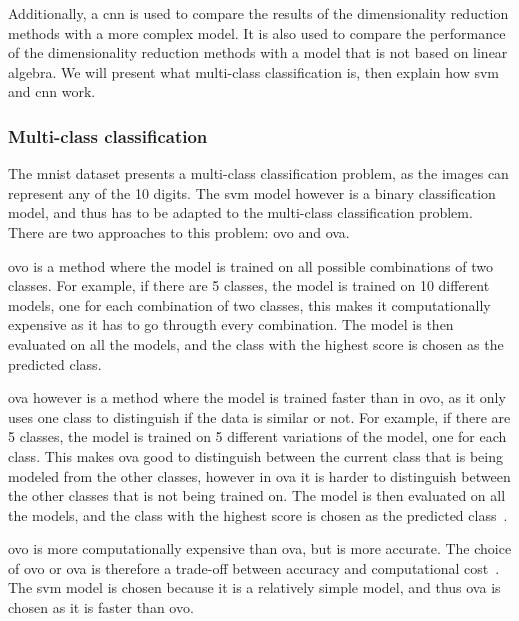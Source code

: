 
Additionally, a \gls{cnn} is used to compare the results of the dimensionality reduction methods with a more complex model. It is also used to compare the performance of the dimensionality reduction methods with a model that is not based on linear algebra. We will present what multi-class classification is, then explain how \gls{svm} and \gls{cnn} work.


\subsubsection{Multi-class classification}\label{subsubsec:multi-class-classification}
The \gls{mnist} dataset presents a multi-class classification problem, as the images can represent any of the 10 digits. The \gls{svm} model however is a binary classification model, and thus has to be adapted to the multi-class classification problem. There are two approaches to this problem: \gls{ovo} and \gls{ova}.

\gls{ovo} is a method where the model is trained on all possible combinations of two classes. For example, if there are 5 classes, the model is trained on 10 different models, one for each combination of two classes, this makes it computationally expensive as it has to go througth every combination. The model is then evaluated on all the models, and the class with the highest score is chosen as the predicted class.

\gls{ova} however is a method where the model is trained faster than in \gls{ovo}, as it only uses one class to distinguish if the data is similar or not. For example, if there are 5 classes, the model is trained on 5 different variations of the model, one for each class. This makes \gls{ova} good to distinguish between the current class that is being modeled from the other classes, however in \gls{ova} it is harder to distinguish between the other classes that is not being trained on. The model is then evaluated on all the models, and the class with the highest score is chosen as the predicted class~\cite{james-statistical-learning}.

\gls{ovo} is more computationally expensive than \gls{ova}, but is more accurate. The choice of \gls{ovo} or \gls{ova} is therefore a trade-off between accuracy and computational cost~\cite{james-statistical-learning}. The \gls{svm} model is chosen because it is a relatively simple model, and thus \gls{ova} is chosen as it is faster than \gls{ovo}.


